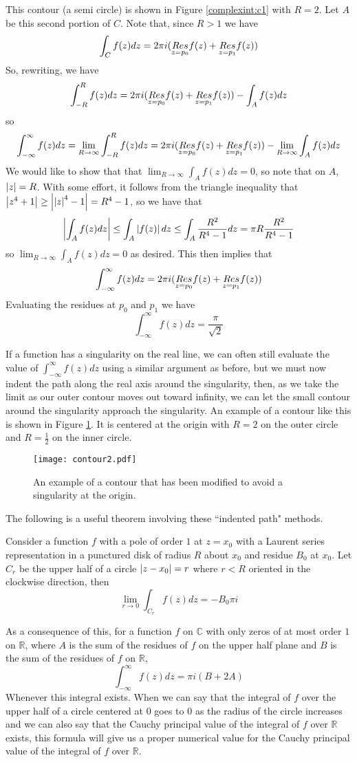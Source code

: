 This contour (a semi circle) is shown in Figure \ref{complexint:c1} with $R = 2$.
Let $A$ be this second portion of $C$.
Note that, since $R>1$ we have
\[\int_C f(z)dz = 2\pi i (\underset{z=p_0}{Res} f(z) +\underset{z=p_1}{Res} f(z))\]
So, rewriting, we have
\[\int_{-R}^R f(z) dz = 2\pi i (\underset{z=p_0}{Res} f(z) +\underset{z=p_1}{Res} f(z)) - \int_A f(z) dz\]
so
\[\int_{-\infty}^{\infty} f(z) dz = \lim_{R\to \infty} \int_{-R}^R f(z) dz = 2\pi i (\underset{z=p_0}{Res} f(z) +\underset{z=p_1}{Res} f(z)) - \lim_{R\to \infty} \int_A f(z) dz\]
We would like to show that that $\lim_{R\to\infty} \int_A f(z) dz = 0$, so note that on $A$, $\left\lvert z\right\rvert=R$.
With some effort, it follows from the triangle inequality that $\left\lvert z^4+1\right\rvert\geq \left\lvert\left\lvert z\right\rvert^4-1\right\rvert = R^4 -1$, so we have that
\[\left\lvert\int_A f(z) dz\right\rvert\leq \int_A \left\lvert f(z)\right\rvert dz \leq \int_A \frac{R^2}{R^4 -1}dz = \pi R \frac{R^2}{R^4-1}\]
so $\lim_{R\to\infty} \int_A f(z) dz = 0$ as desired.
This then implies that
\[\int_{-\infty}^{\infty} f(z) dz = 2\pi i (\underset{z=p_0}{Res} f(z) +\underset{z=p_1}{Res} f(z))\]
Evaluating the residues at $p_0$ and $p_1$ we have
\[\int_{-\infty}^{\infty} f(z) dz = \frac{\pi}{\sqrt{2}}\]

If a function has a singularity on the real line, we can often still evaluate the value of $\int_{-\infty}^{\infty} f(z) dz$ using a similar argument as before, but we must now indent the path along the real axis around the singularity, then, as we take the limit as our outer contour moves out toward infinity, we can let the small contour around the singularity approach the singularity.
An example of a contour like this is shown in Figure \ref{complexint:c2}.
It is centered at the origin with $R=2$ on the outer circle and $R=\frac{1}{2}$ on the inner circle.

\begin{figure}
\texttt{[image: contour2.pdf]}
\caption{An example of a contour that has been modified to avoid a singularity at the origin.}
\label{complexint:c2}
\end{figure}

The following is a useful theorem involving these ``indented path" methods.
\begin{theorem}
Consider a function $f$ with a pole of order $1$ at $z=x_0$ with a Laurent series representation in a punctured disk of radius $R$ about $x_0$ and residue $B_0$ at $x_0$.
Let $C_r$ be the upper half of a circle $\left\lvert z-x_0\right\rvert=r$ where $r<R$ oriented in the clockwise direction, then
\[\lim_{r\to 0} \int_{C_r} f(z) dz = - B_0 \pi i\]
\end{theorem}
As a consequence of this, for a function $f$ on $\mathbb{C}$ with only zeros of at most order $1$ on $\mathbb{R}$, where $A$ is the sum of the residues of $f$ on the upper half plane and $B$ is the sum of the residues of $f$ on $\mathbb{R}$,
\[\int_{-\infty}^{\infty} f(z) dz = \pi i (B+2A)\]
Whenever this integral exists.
When we can say that the integral of $f$ over the upper half of a circle centered at $0$ goes to $0$ as the radius of the circle increases and we can also say that the Cauchy principal value of the integral of $f$ over $\mathbb{R}$ exists, this formula will give us a proper numerical value for the Cauchy principal value of the integral of $f$ over $\mathbb{R}$.

